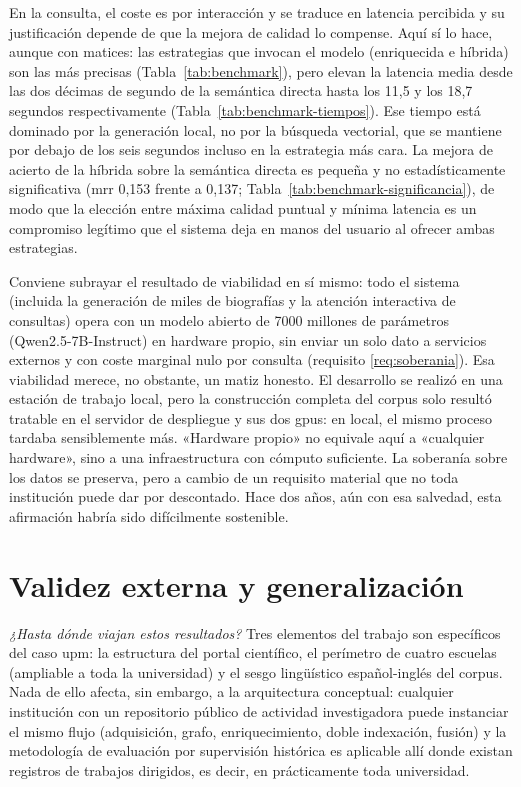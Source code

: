 En la consulta, el coste es por interacción y se traduce en latencia percibida y su justificación depende de que la mejora de calidad lo compense.
Aquí sí lo hace, aunque con matices: las estrategias que invocan el modelo (enriquecida e híbrida) son las más precisas (Tabla~\ref{tab:benchmark}), pero elevan la latencia media desde las dos décimas de segundo de la semántica directa hasta los 11,5 y los 18,7 segundos respectivamente (Tabla~\ref{tab:benchmark-tiempos}).
Ese tiempo está dominado por la generación local, no por la búsqueda vectorial, que se mantiene por debajo de los seis segundos incluso en la estrategia más cara.
La mejora de acierto de la híbrida sobre la semántica directa es pequeña y no estadísticamente significativa (\gls{mrr} 0,153 frente a 0,137; Tabla~\ref{tab:benchmark-significancia}), de modo que la elección entre máxima calidad puntual y mínima latencia es un compromiso legítimo que el sistema deja en manos del usuario al ofrecer ambas estrategias.

Conviene subrayar el resultado de viabilidad en sí mismo: todo el sistema (incluida la generación de miles de biografías y la atención interactiva de consultas) opera con un modelo abierto de 7000 millones de parámetros (Qwen2.5-7B-Instruct) en hardware propio, sin enviar un solo dato a servicios externos y con coste marginal nulo por consulta (requisito \ref{req:soberania}).
Esa viabilidad merece, no obstante, un matiz honesto.
El desarrollo se realizó en una estación de trabajo local, pero la construcción completa del corpus solo resultó tratable en el servidor de despliegue y sus dos \glspl{gpu}: en local, el mismo proceso tardaba sensiblemente más.
«Hardware propio» no equivale aquí a «cualquier hardware», sino a una infraestructura con cómputo suficiente.
La soberanía sobre los datos se preserva, pero a cambio de un requisito material que no toda institución puede dar por descontado.
Hace dos años, aún con esa salvedad, esta afirmación habría sido difícilmente sostenible.

\section{Validez externa y generalización}
\label{sec:disc-generalizacion}

\emph{¿Hasta dónde viajan estos resultados?}
Tres elementos del trabajo son específicos del caso \gls{upm}: la estructura del portal científico, el perímetro de cuatro escuelas (ampliable a toda la universidad) y el sesgo lingüístico español-inglés del corpus.
Nada de ello afecta, sin embargo, a la arquitectura conceptual: cualquier institución con un repositorio público de actividad investigadora puede instanciar el mismo flujo (adquisición, grafo, enriquecimiento, doble indexación, fusión) y la metodología de evaluación por supervisión histórica es aplicable allí donde existan registros de trabajos dirigidos, es decir, en prácticamente toda universidad.

